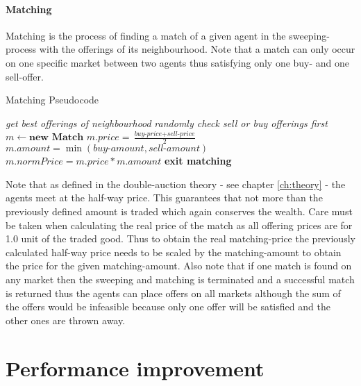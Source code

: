 \documentclass[Bachelorarbeit.tex]{subfiles}
\begin{document}
\paragraph{Matching}
Matching is the process of finding a match of a given agent in the sweeping-process with the offerings of its neighbourhood. Note that a match can only occur on one specific market between two agents thus satisfying only one buy- and one sell-offer.

\begin{algorithm}
\caption{Matching Pseudocode}
\begin{algorithmic}[1]
\State \textit{get best offerings of neighbourhood}
	\State \textit{randomly check sell or buy offerings first}
		\State $m \gets \textbf{new Match}$
		\State $m.price = \frac{\textit{buy-price} + \textit{sell-price}}{2}$
		\State $m.amount = \min(\textit{buy-amount}, \textit{sell-amount})$
		\State $m.normPrice = m.price * m.amount$
		\State \textbf{exit matching}
	\EndIf
\EndFor
\end{algorithmic}
\end{algorithm}

Note that as defined in the double-auction theory - see chapter \ref{ch:theory} - the agents meet at the half-way price. This guarantees that not more than the previously defined amount is traded which again conserves the wealth. Care must be taken when calculating the real price of the match as all offering prices are for 1.0 unit of the traded good. Thus to obtain the real matching-price the previously calculated half-way price needs to be scaled by the matching-amount to obtain the price for the given matching-amount.
\medskip
Also note that if one match is found on any market then the sweeping and matching is terminated and a successful match is returned thus the agents can place offers on all markets although the sum of the offers would be infeasible because only one offer will be satisfied and the other ones are thrown away.

\section{Performance improvement}
\label{sec:implementation_performanceImprovement}
\end{document}
